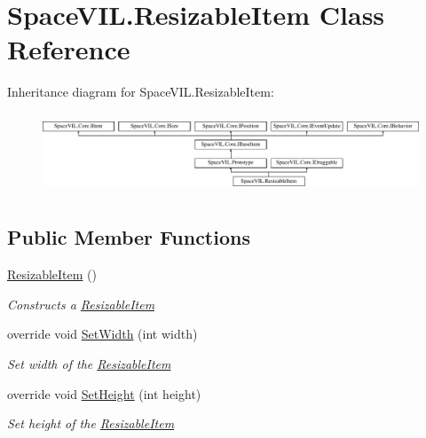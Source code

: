 \hypertarget{class_space_v_i_l_1_1_resizable_item}{}\section{Space\+V\+I\+L.\+Resizable\+Item Class Reference}
\label{class_space_v_i_l_1_1_resizable_item}
Inheritance diagram for Space\+V\+I\+L.\+Resizable\+Item\+:\begin{figure}[H]
\begin{center}
\leavevmode
\includegraphics[height=2.421622cm]{class_space_v_i_l_1_1_resizable_item}
\end{center}
\end{figure}
\subsection*{Public Member Functions}
\begin{DoxyCompactItemize}
\item 
\mbox{\hyperlink{class_space_v_i_l_1_1_resizable_item_aa953ea18fb705e9cfe7da688f10530b2}{Resizable\+Item}} ()
\begin{DoxyCompactList}\small\item\em Constructs a \mbox{\hyperlink{class_space_v_i_l_1_1_resizable_item}{Resizable\+Item}} \end{DoxyCompactList}\item 
override void \mbox{\hyperlink{class_space_v_i_l_1_1_resizable_item_a7f12553e7547d5ef653be8719e9cfee4}{Set\+Width}} (int width)
\begin{DoxyCompactList}\small\item\em Set width of the \mbox{\hyperlink{class_space_v_i_l_1_1_resizable_item}{Resizable\+Item}} \end{DoxyCompactList}\item 
override void \mbox{\hyperlink{class_space_v_i_l_1_1_resizable_item_a9ffdafec963a452576589d3efc452356}{Set\+Height}} (int height)
\begin{DoxyCompactList}\small\item\em Set height of the \mbox{\hyperlink{class_space_v_i_l_1_1_resizable_item}{Resizable\+Item}} \end{DoxyCompactList}\end{DoxyCompactItemize}
